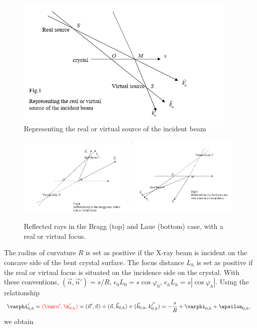 \documentclass{iucr}              %
\newcommand{\inblue}[1]{{\color{blue}#1}}
\newcommand{\inred}[1]{{\color{red}#1}}
\begin{document}
\begin{figure}
\label{FIG_LENS1}
\caption{Representing the real or virtual source of the incident beam}
\includegraphics[width=0.95\textwidth]{Fig1.png}
\end{figure}

\begin{figure}
\label{FIG_LENS2}
\caption{Reflected rays in the Bragg (top) and Laue (bottom) case, with a real or virtual focus.}
\includegraphics[width=0.49\textwidth]{Fig2a.png}
\includegraphics[width=0.49\textwidth]{Fig2b.png}
\end{figure}

The radius of curvature $R$ is set as positive if the X-ray beam is incident on the concave side of the bent crystal surface. The focus distance $L_h$ is set as positive if the real or virtual focus is \inblue{situated on the incidence side on the crystal.} With these conventions, $(\vec n,\vec n')=s/R$, $\epsilon_0 L_0 = s \cos\varphi_0$,  $\epsilon_h L_h = s |\cos\varphi_h|$. Using the relationship
\begin{equation}
    \varphi'_{0,h} = 
    \inred{(\var n', \k'_{0,h})} = 
    (\vec n', \vec n) + (\vec n,\vec k_{0,h}) + (\vec k_{0,h}, \vec{k'_{0,h}}) = -\frac{s}{R} + \varphi_{0,h} + \epsilon_{0,h},
\end{equation}
we obtain
\end{document}
